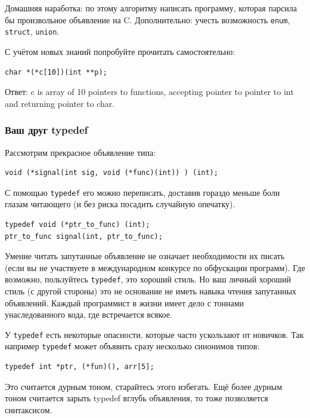 \documentclass[a4paper,12pt,oneside]{article}
\begin{document}
Домашняя наработка: по этому алгоритму написать программу, которая парсила бы произвольное объявление на C. Дополнительно: учесть возможность \lstinline!enum!, \lstinline!struct!, \lstinline!union!.

С учётом новых знаний попробуйте прочитать самостоятельно:

\begin{lstlisting}
char *(*c[10])(int **p);
\end{lstlisting}

Ответ: c is array of 10 pointers to functions, accepting pointer to pointer to int and returning pointer to char.

\subsubsection{Ваш друг typedef}

Рассмотрим прекрасное объявление типа:

\begin{lstlisting}
void (*signal(int sig, void (*func)(int)) ) (int);
\end{lstlisting}

С помощью \lstinline!typedef! его можно переписать, доставив гораздо меньше боли глазам читающего (и без риска посадить случайную опечатку).

\begin{lstlisting}
typedef void (*ptr_to_func) (int);
ptr_to_func signal(int, ptr_to_func);
\end{lstlisting}

Умение читать запутанные объявление не означает необходимости их писать (если вы не участвуете в международном конкурсе по обфускации программ). Где возможно, пользуйтесь \lstinline!typedef!, это хороший стиль. Но ваш личный хороший стиль (с другой стороны) это не основание не иметь навыка чтения запутанных объявлений. Каждый программист в жизни имеет дело с тоннами унаследованного кода, где встречается всякое.

У \lstinline!typedef! есть некоторые опасности, которые часто ускользают от новичков. Так например \lstinline!typedef! может объявить сразу несколько синонимов типов:

\begin{lstlisting}
typedef int *ptr, (*fun)(), arr[5];
\end{lstlisting}

Это считается дурным тоном, старайтесь этого избегать. Ещё более дурным тоном считается зарыть typedef вглубь объявления, то тоже позволяется синтаксисом.
\end{document}
